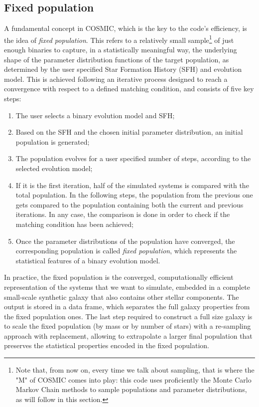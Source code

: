 \subsection{Fixed population}
A fundamental concept in COSMIC, which is the key to the code's efficiency, is the idea of \textit{fixed population}.
This refers to a relatively small sample\footnote{Note that, from now on, every time we talk about sampling, that is where the "M" of COSMIC comes into play: this code uses proficiently the Monte Carlo Markov Chain methods to sample populations and parameter distributions, as will follow in this section.} of just enough binaries to capture, in a statistically meaningful way, the underlying shape of the parameter distribution functions of the target population, as determined by the user specified Star Formation History (SFH) and evolution model.
This is achieved following an iterative process designed to reach a convergence with respect to a defined matching condition, and consists of five key steps:
\begin{enumerate}
    \item The user selects a binary evolution model and SFH;
    \item Based on the SFH and the chosen initial parameter distribution, an initial population is generated;
    \item The population evolves for a user specified number of steps, according to the selected evolution model;
    \item If it is the first iteration, half of the simulated systems is compared with the total population. In the following steps, the population from the previous one gets compared to the population containing both the current and previous iterations.
    In any case, the comparison is done in order to check if the matching condition has been achieved;
    \item Once the parameter distributions of the population have converged, the corresponding population is called \textit{fixed population}, which represents the statistical features of a binary evolution model.
\end{enumerate}
In practice, the fixed population is the converged, computationally efficient representation of the systems that we want to simulate, embedded in a complete small-scale synthetic galaxy that also contains other stellar components.
The output is stored in a data frame, which separates the full galaxy properties from the fixed population ones.
The last step required to construct a full size galaxy is to scale the fixed population (by mass or by number of stars) with a re-sampling approach with replacement, allowing to extrapolate a larger final population that preserves the statistical properties encoded in the fixed population.

